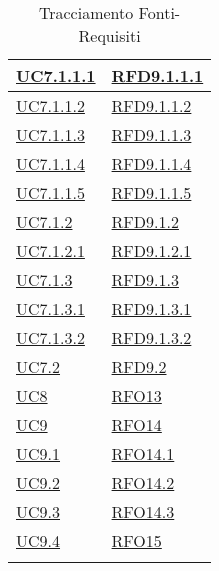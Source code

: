 \begin{longtable}{|>{\centering}m{5cm}|m{5cm}<{\centering}|}
\hyperref[UC7.1.1.1]{UC7.1.1.1} & \hyperlink{RFD9.1.1.1}{RFD9.1.1.1}\\ \hline
\hyperref[UC7.1.1.2]{UC7.1.1.2} & \hyperlink{RFD9.1.1.2}{RFD9.1.1.2}\\ \hline
\hyperref[UC7.1.1.3]{UC7.1.1.3} & \hyperlink{RFD9.1.1.3}{RFD9.1.1.3}\\ \hline
\hyperref[UC7.1.1.4]{UC7.1.1.4} & \hyperlink{RFD9.1.1.4}{RFD9.1.1.4}\\ \hline
\hyperref[UC7.1.1.5]{UC7.1.1.5} & \hyperlink{RFD9.1.1.5}{RFD9.1.1.5}\\ \hline
\hyperref[UC7.1.2]{UC7.1.2} & \hyperlink{RFD9.1.2}{RFD9.1.2}\\ \hline
\hyperref[UC7.1.2.1]{UC7.1.2.1} & \hyperlink{RFD9.1.2.1}{RFD9.1.2.1}\\ \hline
\hyperref[UC7.1.3]{UC7.1.3} & \hyperlink{RFD9.1.3}{RFD9.1.3}\\ \hline
\hyperref[UC7.1.3.1]{UC7.1.3.1} & \hyperlink{RFD9.1.3.1}{RFD9.1.3.1}\\ \hline
\hyperref[UC7.1.3.2]{UC7.1.3.2} & \hyperlink{RFD9.1.3.2}{RFD9.1.3.2}\\ \hline
\hyperref[UC7.2]{UC7.2} & \hyperlink{RFD9.2}{RFD9.2}\\ \hline
\hyperref[UC8]{UC8} & \hyperlink{RFO13}{RFO13}\\ \hline
\hyperref[UC9]{UC9} & \hyperlink{RFO14}{RFO14}\\ \hline
\hyperref[UC9.1]{UC9.1} & \hyperlink{RFO14.1}{RFO14.1}\\ \hline
\hyperref[UC9.2]{UC9.2} & \hyperlink{RFO14.2}{RFO14.2}\\ \hline
\hyperref[UC9.3]{UC9.3} & \hyperlink{RFO14.3}{RFO14.3}\\ \hline
\hyperref[UC9.4]{UC9.4} & \hyperlink{RFO15}{RFO15}\\ \hline
\caption[Tracciamento Fonti-Requisiti]{Tracciamento Fonti-Requisiti}
\label{tabella:fonti-requi}
\end{longtable}
\clearpage
